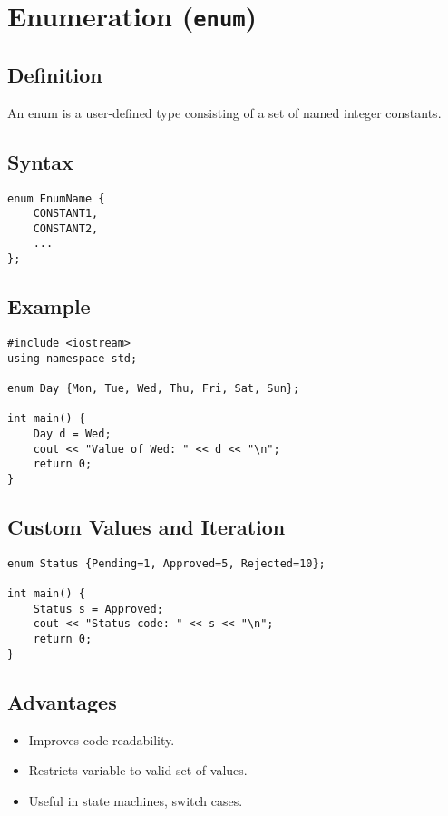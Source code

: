 \section{Enumeration (\texttt{enum})}

\subsection*{Definition}
An enum is a user-defined type consisting of a set of named integer constants.

\subsection*{Syntax}
\begin{lstlisting}[caption=Syntax of enum]
enum EnumName {
    CONSTANT1,
    CONSTANT2,
    ...
};
\end{lstlisting}

\subsection*{Example}
\begin{lstlisting}[caption=C++ Code using enum]
#include <iostream>
using namespace std;

enum Day {Mon, Tue, Wed, Thu, Fri, Sat, Sun};

int main() {
    Day d = Wed;
    cout << "Value of Wed: " << d << "\n";
    return 0;
}
\end{lstlisting}

\subsection*{Custom Values and Iteration}
\begin{lstlisting}[caption=Enum with custom values and loop]
enum Status {Pending=1, Approved=5, Rejected=10};

int main() {
    Status s = Approved;
    cout << "Status code: " << s << "\n";
    return 0;
}
\end{lstlisting}

\subsection*{Advantages}
\begin{itemize}
  \item Improves code readability.
  \item Restricts variable to valid set of values.
  \item Useful in state machines, switch cases.
\end{itemize}

